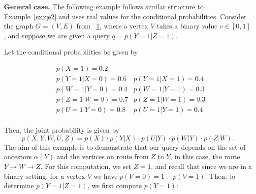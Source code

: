 







\begin{example}

\textbf{General case.} The following example follows similar structure to Example~\ref{ex:qe2} and uses real values for the conditional probabilities. Consider the graph $G=(V,E)$ from ~\ref{fig:costofquery}, where a vertex $V$ takes a binary value $v \in [0,1]$, and suppose we are given a query $q = p(Y=1|Z=1)$. \newline
\begin{figure}[h!]
\centering
\begin{center}
\end{center}
\caption{}
\label{fig:costofquery}
\end{figure}
\null \quad \quad Let the conditional probabilities be given by

\begin{align*}
	& p(X = 1) = 0.2 			& \\
	& p(Y = 1 | X = 0) = 0.6		& p(Y = 1 | X = 1) = 0.4 \\ 
	& p(W = 1 | Y = 0) = 0.4		& p(W = 1 | Y = 1) = 0.3 \\
	& p(Z = 1 | W = 0) = 0.7		& p(Z = 1 | W = 1) = 0.3 \\ 
	& p(U = 1 | Y = 0) = 0.8		& p(U = 1 | Y = 1) = 0.4 \\
\end{align*}


Then, the joint probability is given by $$p(X,Y,W,U,Z) = p(X) \cdot p(Y|X) \cdot p(U|Y) \cdot p(W|Y) \cdot p(Z|W).$$ 
\null \quad \quad The aim of this example is to demonstrate that our query depends on the set of ancestors $\alpha(Y)$ and the vertices on route from $Z$ to $Y$, in this case, the route $Y \rightarrow W \rightarrow Z$. For this computation, we set $Z=1$, and recall that since we are in a binary setting, for a vertex $V$ we have $p(V=0) = 1 - p(V=1)$. Then, to determine $p(Y=1|Z=1)$, we first compute $p(Y=1)$:


\end{example}
